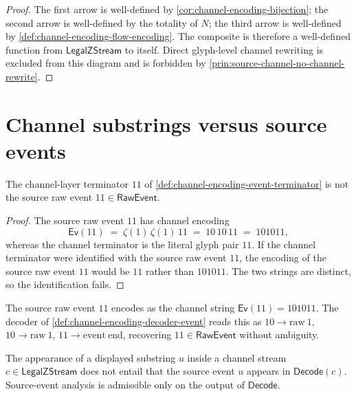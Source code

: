 \begin{proof}
The first arrow is well-defined by \autoref{cor:channel-encoding-bijection}; the second arrow is well-defined by the totality of $N$; the third arrow is well-defined by \autoref{def:channel-encoding-flow-encoding}. The composite is therefore a well-defined function from $\mathsf{LegalZStream}$ to itself. Direct glyph-level channel rewriting is excluded from this diagram and is forbidden by \autoref{prin:source-channel-no-channel-rewrite}.
\end{proof}

\section{Channel substrings versus source events}
\label{sec:source-channel-substrings-vs-events}

\begin{proposition}
\label{prop:source-channel-terminator-not-source-event-11}
The channel-layer terminator $11$ of \autoref{def:channel-encoding-event-terminator} is not the source raw event $11 \in \mathsf{RawEvent}$.
\end{proposition}

\begin{proof}
The source raw event $11$ has channel encoding
$$
  \mathsf{Ev}(11)
  \;=\; \zeta(1)\,\zeta(1)\,11
  \;=\; 10\,10\,11
  \;=\; 101011,
$$
whereas the channel terminator is the literal glyph pair $11$. If the channel terminator were identified with the source raw event $11$, the encoding of the source raw event $11$ would be $11$ rather than $101011$. The two strings are distinct, so the identification fails.
\end{proof}

\begin{corollary}
\label{cor:source-channel-source-event-11-unambiguous}
The source raw event $11$ encodes as the channel string $\mathsf{Ev}(11) = 101011$. The decoder of \autoref{def:channel-encoding-decoder-event} reads this as $10 \to \mathrm{raw}\ 1$, $10 \to \mathrm{raw}\ 1$, $11 \to \mathrm{event\ end}$, recovering $11 \in \mathsf{RawEvent}$ without ambiguity.
\end{corollary}

\begin{principle}
\label{prin:source-channel-no-proof-by-substring}
The appearance of a displayed substring $u$ inside a channel stream $c \in \mathsf{LegalZStream}$ does not entail that the source event $u$ appears in $\mathsf{Decode}(c)$. Source-event analysis is admissible only on the output of $\mathsf{Decode}$.
\end{principle}

